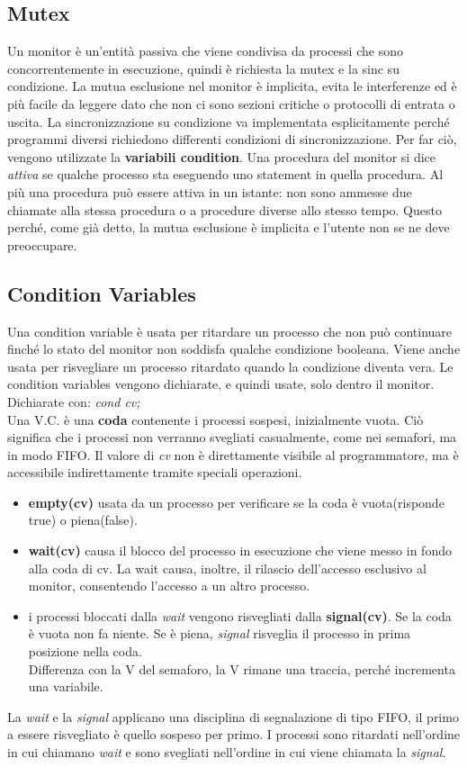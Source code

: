 \documentclass[10pt,a4paper]{book}
\begin{document}
\subsection{Mutex}
Un monitor è un'entità passiva che viene condivisa da processi che sono concorrentemente in esecuzione, quindi è richiesta la mutex e la sinc su condizione.
La mutua esclusione nel monitor è implicita, evita le interferenze ed è più facile da leggere dato che non ci sono sezioni critiche o protocolli di entrata o uscita.
La sincronizzazione su condizione va implementata esplicitamente perché programmi diversi richiedono differenti condizioni di sincronizzazione. Per far ciò, vengono utilizzate la \textbf{variabili condition}.
Una procedura del monitor si dice \textit{attiva} se qualche processo sta eseguendo uno statement in quella procedura. Al più una procedura può essere attiva in un istante: non sono ammesse due chiamate alla stessa procedura o a procedure diverse allo stesso tempo. Questo perché, come già detto, la mutua esclusione è implicita e l'utente non se ne deve preoccupare.

\subsection{Condition Variables}
Una condition variable è usata per ritardare un processo che non può continuare finché lo stato del monitor non soddisfa qualche condizione booleana. Viene anche usata per risvegliare un processo ritardato quando la condizione diventa vera.
Le condition variables vengono dichiarate, e quindi usate, solo dentro il monitor.
Dichiarate con: \textit{cond cv;} \\
Una V.C. è una \textbf{coda} contenente i processi sospesi, inizialmente vuota. Ciò significa che i processi non verranno svegliati casualmente, come nei semafori, ma in modo FIFO. Il valore di \textit{cv} non è direttamente visibile al programmatore, ma è accessibile indirettamente tramite speciali operazioni.
\begin{itemize}
\item \textbf{empty(cv)} usata da un processo per verificare se la coda è vuota(risponde true) o piena(false).
\item \textbf{wait(cv)} causa il blocco del processo in esecuzione che viene messo in fondo alla coda di cv. La wait causa, inoltre, il rilascio dell'accesso esclusivo al monitor, consentendo l'accesso a un altro processo.
\item i processi bloccati dalla \textit{wait} vengono risvegliati dalla \textbf{signal(cv)}. Se la coda è vuota non fa niente. Se è piena, \textit{signal} risveglia il processo in prima posizione nella coda.\\
Differenza con la V del semaforo, la V rimane una traccia, perché incrementa una variabile.
\end{itemize}
La \textit{wait} e la \textit{signal} applicano una disciplina di segnalazione di tipo FIFO, il primo a essere risvegliato è quello sospeso per primo. I processi sono ritardati nell'ordine in cui chiamano \textit{wait} e sono svegliati nell'ordine in cui viene chiamata la \textit{signal}.
\end{document}
